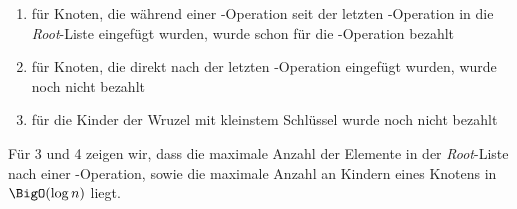 \begin{description}
\begin{itemize}
\begin{enumerate}
					\item für Knoten, die während einer \decKey-Operation seit der letzten \exMin-Operation in die \textit{Root}-Liste eingefügt wurden, wurde schon für die \cons-Operation bezahlt
					\item für Knoten, die direkt nach der letzten \exMin-Operation eingefügt wurden, wurde noch nicht bezahlt
					\item für die Kinder der Wruzel mit kleinstem Schlüssel wurde noch nicht bezahlt
				\end{enumerate}
		\end{itemize}
		Für 3 und 4 zeigen wir, dass die maximale Anzahl der Elemente in der \textit{Root}-Liste nach einer \cons-Operation, sowie die maximale Anzahl an Kindern eines Knotens in $\BigO(\log n)$ liegt.
\end{description}
\topbreak\ \\\up\up\up
